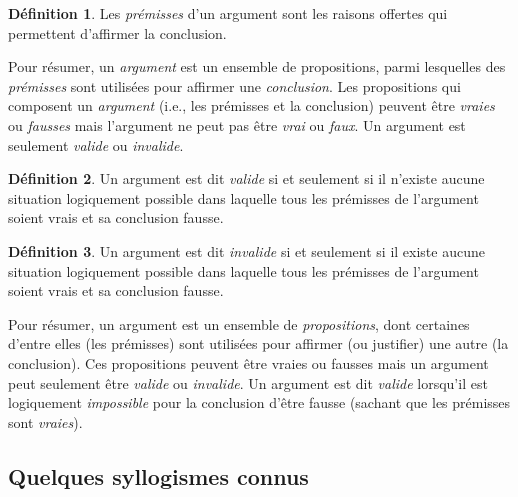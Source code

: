 \documentclass[
  a4paper,11pt,twoside,onecolumn,openright,final,oldfontcommands]{memoir}
\theoremstyle{definition}
\newtheorem{definition}{Définition}[chapter]
\theoremstyle{definition}
\theoremstyle{definition}
\theoremstyle{definition}
\theoremstyle{remark}
\begin{document}
\begin{definition}
\protect\hypertarget{def:prémisse}{}\label{def:prémisse}Les \emph{prémisses} d'un argument sont les raisons offertes qui permettent d'affirmer la conclusion.
\end{definition}

Pour résumer, un \emph{argument} est un ensemble de propositions, parmi lesquelles des \emph{prémisses} sont utilisées pour affirmer une \emph{conclusion}. Les propositions qui composent un \emph{argument} (i.e., les prémisses et la conclusion) peuvent être \emph{vraies} ou \emph{fausses} mais l'argument ne peut pas être \emph{vrai} ou \emph{faux}. Un argument est seulement \emph{valide} ou \emph{invalide}.

\begin{definition}
\protect\hypertarget{def:valide}{}\label{def:valide}Un argument est dit \emph{valide} si et seulement si il n'existe aucune situation logiquement possible dans laquelle tous les prémisses de l'argument soient vrais et sa conclusion fausse.
\end{definition}

\begin{definition}
\protect\hypertarget{def:invalide}{}\label{def:invalide}Un argument est dit \emph{invalide} si et seulement si il existe aucune situation logiquement possible dans laquelle tous les prémisses de l'argument soient vrais et sa conclusion fausse.
\end{definition}

Pour résumer, un argument est un ensemble de \emph{propositions}, dont certaines d'entre elles (les prémisses) sont utilisées pour affirmer (ou justifier) une autre (la conclusion). Ces propositions peuvent être vraies ou fausses mais un argument peut seulement être \emph{valide} ou \emph{invalide}. Un argument est dit \emph{valide} lorsqu'il est logiquement \emph{impossible} pour la conclusion d'être fausse (sachant que les prémisses sont \emph{vraies}).

\hypertarget{quelques-syllogismes-connus}{%
\subsection{Quelques syllogismes connus}\label{quelques-syllogismes-connus}}
\end{document}
